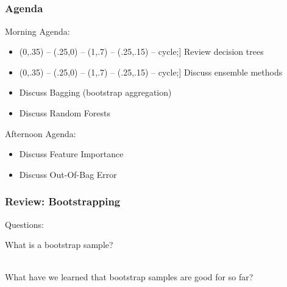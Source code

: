 \documentclass[table,dvipsnames]{beamer}
\def\checkmark{\tikz\fill[scale=0.4](0,.35) -- (.25,0) -- (1,.7) -- (.25,.15) -- cycle;}
\newcommand{\keywd}{\textcolor{myorange}}
\begin{document}
\subsection{}
\begin{frame}
\frametitle{Agenda}
\scriptsize
Morning Agenda:

\begin{block}{}
\begin{itemize}
    \item[\checkmark] Review decision trees
    \item[\checkmark] Discuss ensemble methods
    \item Discuss \keywd{Bagging} (bootstrap aggregation)
    \item Discuss \keywd{Random Forests}
\end{itemize}
\end{block}

Afternoon Agenda:

\begin{block}{}
\begin{itemize}
    \item Discuss \keywd{Feature Importance}
    \item Discuss \keywd{Out-Of-Bag Error}
\end{itemize}
\end{block}
\end{frame}


\begin{frame}
\frametitle{Review: Bootstrapping}
Questions:

What is a bootstrap sample?

\ \\

What have we learned that bootstrap samples are good for so far?
\end{frame}
\end{document}
